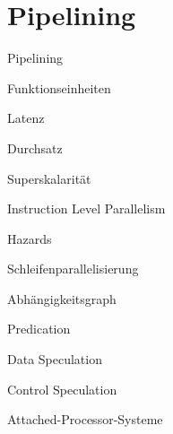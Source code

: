 
\section{Pipelining}

\begin{defi}{Pipelining}

\end{defi}

\begin{defi}[Pipelining]{Funktionseinheiten}

\end{defi}

\begin{defi}[Pipelining]{Latenz}

\end{defi}

\begin{defi}[Pipelining]{Durchsatz}

\end{defi}

\begin{defi}{Superskalarität}

\end{defi}

\begin{defi}{Instruction Level Parallelism}

\end{defi}

\begin{defi}{Hazards}

\end{defi}

\begin{defi}{Schleifenparallelisierung}

\end{defi}

\begin{defi}{Abhängigkeitsgraph}

\end{defi}

\begin{defi}{Predication}

\end{defi}

\begin{defi}{Data Speculation}

\end{defi}

\begin{defi}{Control Speculation}

\end{defi}

\begin{defi}{Attached-Processor-Systeme}

\end{defi}